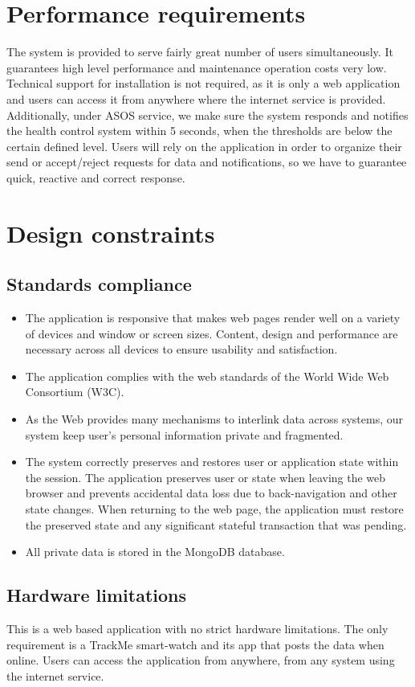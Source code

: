 \documentclass[hidelinks, 12pt]{report}
\begin{document}
\section{Performance requirements}
The system is provided to serve fairly great number of users simultaneously. It guarantees high level performance and maintenance operation costs very low. Technical support for installation is not required, as it is only a web application and users can access it from anywhere where the internet service is provided. Additionally, under ASOS service, we make sure the system responds and notifies the health control system within 5 seconds, when the thresholds are below the certain defined level. Users will rely on the application in order to organize their send or accept/reject requests for data and notifications, so we have to guarantee quick, reactive and correct response.
\section{Design constraints}
\subsection{Standards compliance}
\begin{itemize}
\item{} The application is responsive that makes web pages render well on a variety of devices and window or screen sizes. Content, design and performance are necessary across all devices to ensure usability and satisfaction.
\item{} The application complies with the web standards of the World Wide Web Consortium (W3C).
\item{} As the Web provides many mechanisms to interlink data across systems, our system keep user's personal information private and fragmented.
\item{} The system correctly preserves and restores user or application state within the session. The application preserves user or state when leaving the web browser and prevents accidental data loss due to back-navigation and other state changes. When returning to the web page, the application must restore the preserved state and any significant stateful transaction that was pending.
\item{} All private data is stored in the MongoDB database.
\end{itemize}

\subsection{Hardware limitations}
This is a web based application with no strict hardware limitations. The only requirement is a TrackMe smart-watch and its app that posts the data when online. Users can access the application from anywhere, from any system using the internet service.
\end{document}
